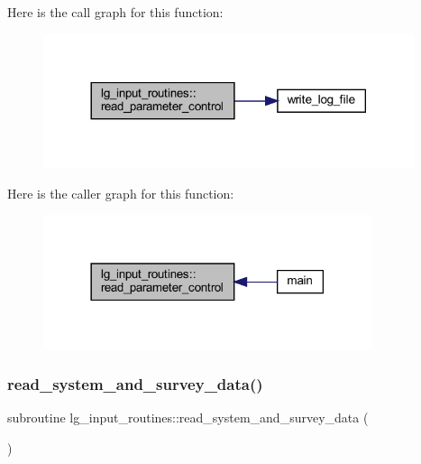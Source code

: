Here is the call graph for this function\+:\nopagebreak
\begin{figure}[H]
\begin{center}
\leavevmode
\includegraphics[width=308pt]{namespacelg__input__routines_a123f91865ea388eca78b77b0d625aa8c_cgraph}
\end{center}
\end{figure}
Here is the caller graph for this function\+:\nopagebreak
\begin{figure}[H]
\begin{center}
\leavevmode
\includegraphics[width=273pt]{namespacelg__input__routines_a123f91865ea388eca78b77b0d625aa8c_icgraph}
\end{center}
\end{figure}
\mbox{\label{namespacelg__input__routines_a80feb058541516d5a6327fb6c344bbbd}} 
\subsubsection{\texorpdfstring{read\+\_\+system\+\_\+and\+\_\+survey\+\_\+data()}{read\_system\_and\_survey\_data()}}
{\footnotesize\ttfamily subroutine lg\+\_\+input\+\_\+routines\+::read\+\_\+system\+\_\+and\+\_\+survey\+\_\+data (\begin{DoxyParamCaption}{ }\end{DoxyParamCaption})}

